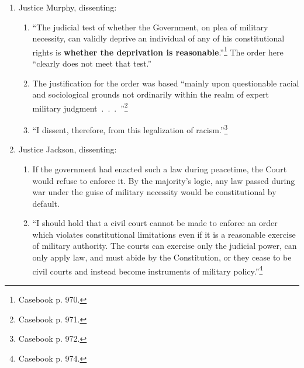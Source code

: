 \begin{enumerate}
    \item Justice Murphy, dissenting:
    \begin{enumerate}
        \item ``The judicial test of whether the Government, on plea of 
        military necessity, can validly deprive an individual of any of 
        his constitutional rights is \textbf{whether the deprivation is 
        reasonable}.''\footnote{Casebook p. 970.} The order here ``clearly 
        does not meet that test.''
        \item The justification for the order was based ``mainly upon 
        questionable racial and sociological grounds not ordinarily within 
        the realm of expert military judgment~.~.~.~''\footnote{Casebook 
        p. 971.}
        \item ``I dissent, therefore, from this legalization of 
        racism.''\footnote{Casebook p. 972.}
    \end{enumerate}
    \item Justice Jackson, dissenting:
    \begin{enumerate}
        \item If the government had enacted such a law during peacetime, 
        the Court would refuse to enforce it. By the majority's logic, any 
        law passed during war under the guise of military necessity would 
        be constitutional by default.
        \item ``I should hold that a civil court cannot be made to enforce 
        an order which violates constitutional limitations even if it is a 
        reasonable exercise of military authority. The courts can exercise 
        only the judicial power, can only apply law, and must abide by the 
        Constitution, or they cease to be civil courts and instead become 
        instruments of military policy.''\footnote{Casebook p. 974.}
    \end{enumerate}
\end{enumerate}

